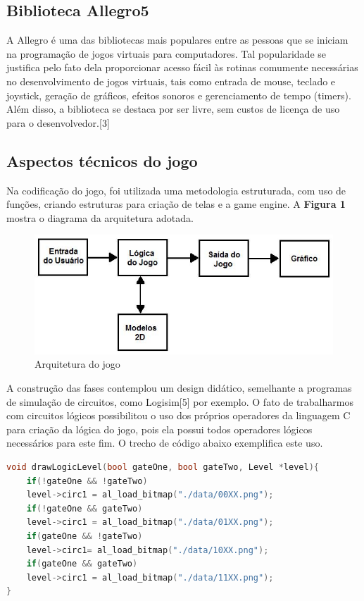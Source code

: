 \documentclass[12pt]{article}
\begin{document}
\subsection{Biblioteca Allegro5}
A Allegro é uma das bibliotecas mais populares entre as pessoas que se iniciam na programação de jogos virtuais para
computadores. Tal popularidade se justifica pelo fato dela proporcionar acesso fácil às
rotinas comumente necessárias no desenvolvimento de jogos virtuais, tais como entrada de mouse, teclado e joystick, geração de gráficos, efeitos sonoros e gerenciamento
de tempo (timers). Além disso, a biblioteca se destaca por ser livre, sem custos de
licença de uso para o desenvolvedor.[3] 

\subsection{Aspectos técnicos do jogo}\label{sec:figs}

Na codificação do jogo, foi utilizada uma metodologia 
estruturada, com uso de funções, criando estruturas para criação de telas e a game engine. 
A \textbf{Figura 1} mostra o diagrama da arquitetura adotada.

\begin{figure}[ht]
\centering
\includegraphics[width=.5\textwidth]{diagrama.jpg}
\caption{Arquitetura do jogo}
\label{fig:exampleFig3}
\end{figure}
A construção das fases contemplou um design didático, semelhante a programas de simulação de circuitos, como Logisim[5] por exemplo.
O fato de trabalharmos com circuitos lógicos possibilitou o uso dos próprios operadores da linguagem C
para criação da lógica do jogo, pois ela possui todos operadores lógicos necessários para este fim. O trecho de código abaixo exemplifica este uso.
\begin{lstlisting}[language=cpp,caption={{Exemplo de código para atribuição com Allegro 5, utilizando operadores lógicos da linguagem C}}]
void drawLogicLevel(bool gateOne, bool gateTwo, Level *level){
	if(!gateOne && !gateTwo) 
	level->circ1 = al_load_bitmap("./data/00XX.png");
	if(!gateOne && gateTwo) 
	level->circ1 = al_load_bitmap("./data/01XX.png");
	if(gateOne && !gateTwo) 
	level->circ1= al_load_bitmap("./data/10XX.png");
	if(gateOne && gateTwo)  
	level->circ1 = al_load_bitmap("./data/11XX.png");
}
\end{lstlisting}
\end{document}
